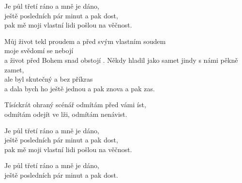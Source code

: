 
\ve{}
    
Je půl třetí ráno
a mně je dáno,\\      
ještě posledních pár minut a pak dost,\\
pak mě moji vlastní lidi pošlou na věčnost.

\ve{}
Můj život tekl proudem
a před svým vlastním soudem\\
moje svědomí se nebojí\\
a život před Bohem snad obstojí .
\ve{}
Někdy hladil jako samet
jindy s námi pěkně zamet,\\
ale byl skutečný a bez příkras\\
a dala bych ho ještě jednou a pak znova a pak zas. 

\cho{}
Tísíckrát ohraný scénář odmítám před vámi íst,\\
odmítám odejít ve lži, odmítám nenávist.

\ve{}
Je půl třetí ráno
a mně je dáno,\\
ještě posledních pár minut a pak dost,\\
pak mě moji vlastní lidi pošlou na věčnost.

Je půl třetí ráno
a mně je dáno,\\
ještě posledních pár minut a pak dost.


\esong{}